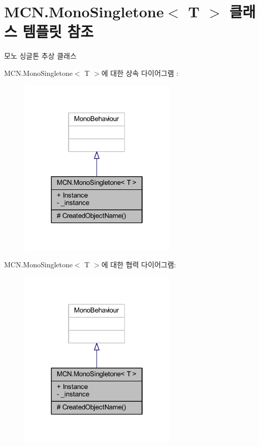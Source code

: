 \hypertarget{class_m_c_n_1_1_mono_singletone}{}\section{M\+C\+N.\+Mono\+Singletone$<$ T $>$ 클래스 템플릿 참조}
\label{class_m_c_n_1_1_mono_singletone}


모노 싱글톤 추상 클래스  




M\+C\+N.\+Mono\+Singletone$<$ T $>$에 대한 상속 다이어그램 \+: \nopagebreak
\begin{figure}[H]
\begin{center}
\leavevmode
\includegraphics[width=214pt]{class_m_c_n_1_1_mono_singletone__inherit__graph}
\end{center}
\end{figure}


M\+C\+N.\+Mono\+Singletone$<$ T $>$에 대한 협력 다이어그램\+:\nopagebreak
\begin{figure}[H]
\begin{center}
\leavevmode
\includegraphics[width=214pt]{class_m_c_n_1_1_mono_singletone__coll__graph}
\end{center}
\end{figure}
